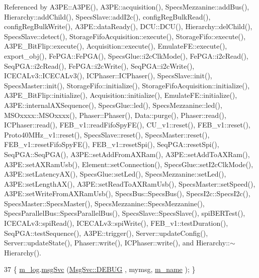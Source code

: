 Referenced by A3\+P\+E\+::\+A3\+P\+E(), A3\+P\+E\+::acquisition(), Specs\+Mezzanine\+::add\+Bus(), Hierarchy\+::add\+Child(), Specs\+Slave\+::add\+I2c(), config\+Reg\+Bulk\+Read(), config\+Reg\+Bulk\+Write(), A3\+P\+E\+::data\+Ready(), D\+C\+U\+::\+D\+C\+U(), Hierarchy\+::del\+Child(), Specs\+Slave\+::detect(), Storage\+Fifo\+Acquisition\+::execute(), Storage\+Fifo\+::execute(), A3\+P\+E\+\_\+\+Bit\+Flip\+::execute(), Acquisition\+::execute(), Emulate\+F\+E\+::execute(), export\+\_\+obj(), Fe\+P\+G\+A\+::\+Fe\+P\+G\+A(), Specs\+Glue\+::i2c\+Clk\+Mode(), Fe\+P\+G\+A\+::i2c\+Read(), Seq\+P\+G\+A\+::i2c\+Read(), Fe\+P\+G\+A\+::i2c\+Write(), Seq\+P\+G\+A\+::i2c\+Write(), I\+C\+E\+C\+A\+Lv3\+::\+I\+C\+E\+C\+A\+Lv3(), I\+C\+Phaser\+::\+I\+C\+Phaser(), Specs\+Slave\+::init(), Specs\+Master\+::init(), Storage\+Fifo\+::initialize(), Storage\+Fifo\+Acquisition\+::initialize(), A3\+P\+E\+\_\+\+Bit\+Flip\+::initialize(), Acquisition\+::initialize(), Emulate\+F\+E\+::initialize(), A3\+P\+E\+::internal\+A\+X\+Sequence(), Specs\+Glue\+::led(), Specs\+Mezzanine\+::led(), M\+S\+Oxxxx\+::\+M\+S\+Oxxxx(), Phaser\+::\+Phaser(), Data\+::purge(), Phaser\+::read(), I\+C\+Phaser\+::read(), F\+E\+B\+\_\+v1\+::read\+Fifo\+Spy\+F\+E(), C\+U\+\_\+v1\+::reset(), F\+E\+B\+\_\+v1\+::reset(), Proto40\+M\+Hz\+\_\+v1\+::reset(), Specs\+Slave\+::reset(), Specs\+Master\+::reset(), F\+E\+B\+\_\+v1\+::reset\+Fifo\+Spy\+F\+E(), F\+E\+B\+\_\+v1\+::reset\+Spi(), Seq\+P\+G\+A\+::reset\+Spi(), Seq\+P\+G\+A\+::\+Seq\+P\+G\+A(), A3\+P\+E\+::set\+Add\+From\+A\+X\+Ram(), A3\+P\+E\+::set\+Add\+To\+A\+X\+Ram(), A3\+P\+E\+::set\+A\+X\+Ram\+Usb(), Element\+::set\+Connection(), Specs\+Glue\+::set\+I2c\+Clk\+Mode(), A3\+P\+E\+::set\+Latency\+A\+X(), Specs\+Glue\+::set\+Led(), Specs\+Mezzanine\+::set\+Led(), A3\+P\+E\+::set\+Length\+A\+X(), A3\+P\+E\+::set\+Read\+To\+A\+X\+Ram\+Usb(), Specs\+Master\+::set\+Speed(), A3\+P\+E\+::set\+Write\+From\+A\+X\+Ram\+Usb(), Specs\+Bus\+::\+Specs\+Bus(), Specs\+I2c\+::\+Specs\+I2c(), Specs\+Master\+::\+Specs\+Master(), Specs\+Mezzanine\+::\+Specs\+Mezzanine(), Specs\+Parallel\+Bus\+::\+Specs\+Parallel\+Bus(), Specs\+Slave\+::\+Specs\+Slave(), spi\+B\+E\+R\+Test(), I\+C\+E\+C\+A\+Lv3\+::spi\+Read(), I\+C\+E\+C\+A\+Lv3\+::spi\+Write(), F\+E\+B\+\_\+v1\+::test\+Duration(), Seq\+P\+G\+A\+::test\+Sequence(), A3\+P\+E\+::trigger(), Server\+::update\+Config(), Server\+::update\+State(), Phaser\+::write(), I\+C\+Phaser\+::write(), and Hierarchy\+::$\sim$\+Hierarchy().


\begin{DoxyCode}
37 \{ \hyperlink{classObject_a0d269813dd7ac1f24bc143031e2963f2}{m\_log}.\hyperlink{classMsgSvc_ad25f18047920cc59a314e5098259711c}{msgSvc} (\hyperlink{classMsgSvc_ae671eb7301996cd049d2da8a65925926a1dbdcc82dce88370ec335883c83b38b0}{MsgSvc::DEBUG}   , mymsg, \hyperlink{classObject_a8b83c95c705d2c3ba0d081fe1710f48d}{m\_name} ); \}
\end{DoxyCode}
\mbox{\label{classObject_a6c9a0397ca804e04d675ed05683f5420}} 
